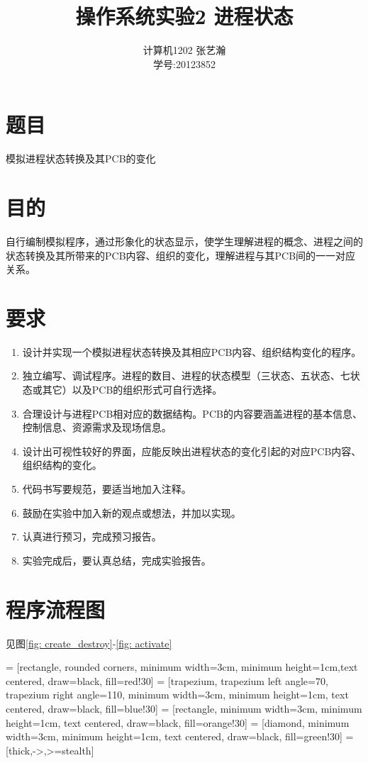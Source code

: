 \documentclass[11pt]{article}
\begin{document}
\title{操作系统实验2 \quad 进程状态}
\author{计算机1202 \quad 张艺瀚\\学号:20123852}
\maketitle

\thispagestyle{fancy}
\normalsize

\section{题目}
模拟进程状态转换及其PCB的变化 

\section{目的}
自行编制模拟程序，通过形象化的状态显示，使学生理解进程的概念、进程之间的状态转换及其所带来的PCB内容、组织的变化，理解进程与其PCB间的一一对应关系。

\section{要求}
\begin{enumerate}
\item 设计并实现一个模拟进程状态转换及其相应PCB内容、组织结构变化的程序。
\item 独立编写、调试程序。进程的数目、进程的状态模型（三状态、五状态、七状态或其它）以及PCB的组织形式可自行选择。
\item 合理设计与进程PCB相对应的数据结构。PCB的内容要涵盖进程的基本信息、控制信息、资源需求及现场信息。
\item 设计出可视性较好的界面，应能反映出进程状态的变化引起的对应PCB内容、组织结构的变化。
\item 代码书写要规范，要适当地加入注释。
\item 鼓励在实验中加入新的观点或想法，并加以实现。
\item 认真进行预习，完成预习报告。
\item 实验完成后，要认真总结，完成实验报告。
\end{enumerate}

\section{程序流程图}
见图\ref{fig: create_destroy}-\ref{fig: activate}

 = [rectangle, rounded corners, minimum width=3cm, minimum height=1cm,text centered, draw=black, fill=red!30]
 = [trapezium, trapezium left angle=70, trapezium right angle=110, minimum width=3cm, minimum height=1cm, text centered, draw=black, fill=blue!30]
 = [rectangle, minimum width=3cm, minimum height=1cm, text centered, draw=black, fill=orange!30]
 = [diamond, minimum width=3cm, minimum height=1cm, text centered, draw=black, fill=green!30]
 = [thick,->,>=stealth]
\end{document}
